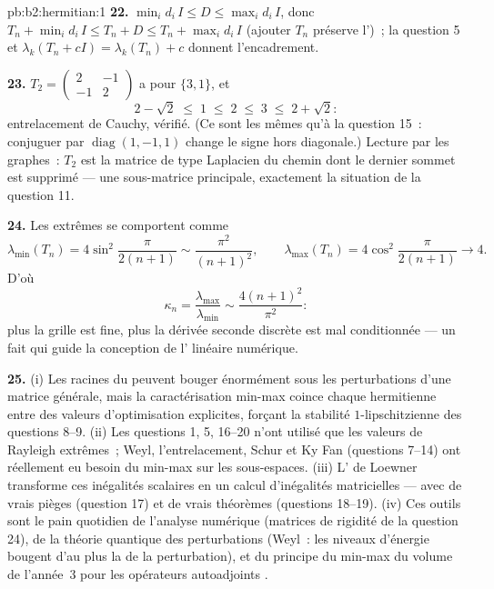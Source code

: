 \begin{solution}{pb:b2:hermitian:1}
\textbf{22.} $\min_id_i\,I \leq D \leq \max_id_i\,I$, donc $T_n +
\min_id_i\,I \leq T_n + D \leq T_n + \max_id_i\,I$
(ajouter $T_n$ préserve l')~; la question 5 et
$\lambda_k(T_n + cI) = \lambda_k(T_n) + c$ donnent l'encadrement.

\textbf{23.} $T_2 = \begin{pmatrix} 2 & -1\\ -1 &
2\end{pmatrix}$ a pour  $\{3, 1\}$, et
\[
2 - \sqrt2 \;\leq\; 1 \;\leq\; 2 \;\leq\; 3 \;\leq\; 2 +
\sqrt2 :
\]
entrelacement de Cauchy, vérifié. (Ce sont les mêmes  qu'à
la question 15~: conjuguer par $\operatorname{diag}(1,-1,1)$ change
le signe hors diagonale.) Lecture par les graphes~: $T_2$ est la
matrice de type Laplacien du chemin dont le dernier sommet est
supprimé --- une sous-matrice principale, exactement la situation de la
question 11.

\textbf{24.} Les  extrêmes se comportent comme
\[
\lambda_{\min}(T_n) = 4\sin^2\frac{\pi}{2(n+1)}
\sim \frac{\pi^2}{(n+1)^2},
\qquad
\lambda_{\max}(T_n) = 4\cos^2\frac{\pi}{2(n+1)}
\longrightarrow 4 .
\]
D'où
\[
\kappa_n = \frac{\lambda_{\max}}{\lambda_{\min}}
\sim \frac{4(n+1)^2}{\pi^2} :
\]
plus la grille est fine, plus la dérivée seconde discrète est mal
conditionnée --- un fait qui guide la conception de l'
linéaire numérique.

\textbf{25.} (i) Les racines du  peuvent
bouger énormément sous les perturbations d'une matrice générale, mais
la caractérisation min-max coince chaque  hermitienne
entre des valeurs d'optimisation explicites, forçant la
stabilité $1$-lipschitzienne des questions 8--9. (ii) Les questions 1, 5, 16--20 n'ont
utilisé que les valeurs de Rayleigh extrêmes~; Weyl, l'entrelacement, Schur et
Ky Fan (questions 7--14) ont réellement eu besoin du min-max 
sur les sous-espaces. (iii) L' de Loewner transforme ces inégalités
scalaires en un calcul d'inégalités matricielles --- avec de
vrais pièges (question 17) et de vrais théorèmes (questions 18--19).
(iv) Ces outils sont le pain quotidien de l'analyse numérique
(matrices de rigidité de la question 24), de la théorie quantique des
perturbations (Weyl~: les niveaux d'énergie bougent d'au plus la 
de la perturbation), et du principe du min-max du volume de l'année~3
pour les opérateurs autoadjoints .
\end{solution}
